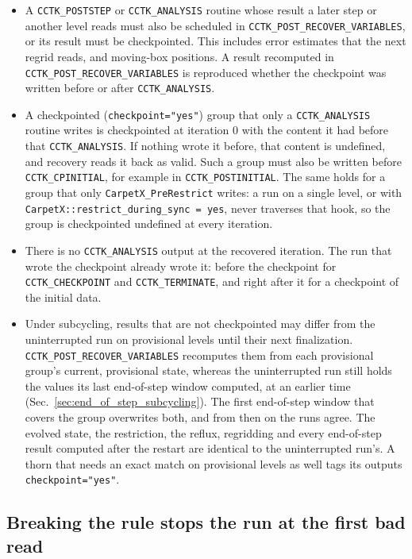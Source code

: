 \begin{itemize}
\item A \texttt{CCTK\_POSTSTEP} or \texttt{CCTK\_ANALYSIS} routine whose result a later step or another level reads must also be scheduled in \texttt{CCTK\_POST\_RECOVER\_VARIABLES}, or its result must be checkpointed. This includes error estimates that the next regrid reads, and moving-box positions. A result recomputed in \texttt{CCTK\_POST\_RECOVER\_VARIABLES} is reproduced whether the checkpoint was written before or after \texttt{CCTK\_ANALYSIS}.
\item A checkpointed (\texttt{checkpoint="yes"}) group that only a \texttt{CCTK\_ANALYSIS} routine writes is checkpointed at iteration 0 with the content it had before that \texttt{CCTK\_ANALYSIS}. If nothing wrote it before, that content is undefined, and recovery reads it back as valid. Such a group must also be written before \texttt{CCTK\_CPINITIAL}, for example in \texttt{CCTK\_POSTINITIAL}. The same holds for a group that only \texttt{CarpetX\_PreRestrict} writes: a run on a single level, or with \texttt{CarpetX::restrict\_during\_sync = yes}, never traverses that hook, so the group is checkpointed undefined at every iteration.
\item There is no \texttt{CCTK\_ANALYSIS} output at the recovered iteration. The run that wrote the checkpoint already wrote it: before the checkpoint for \texttt{CCTK\_CHECKPOINT} and \texttt{CCTK\_TERMINATE}, and right after it for a checkpoint of the initial data.
\item Under subcycling, results that are not checkpointed may differ from the uninterrupted run on provisional levels until their next finalization. \texttt{CCTK\_POST\_RECOVER\_VARIABLES} recomputes them from each provisional group's current, provisional state, whereas the uninterrupted run still holds the values its last end-of-step window computed, at an earlier time (Sec.~\ref{sec:end_of_step_subcycling}). The first end-of-step window that covers the group overwrites both, and from then on the runs agree. The evolved state, the restriction, the reflux, regridding and every end-of-step result computed after the restart are identical to the uninterrupted run's. A thorn that needs an exact match on provisional levels as well tags its outputs \texttt{checkpoint="yes"}.
\end{itemize}

\subsection{Breaking the rule stops the run at the first bad read}

